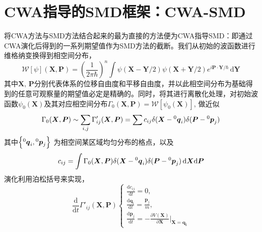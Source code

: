 
\section{CWA指导的SMD框架：CWA-SMD}

将CWA方法与SMD方法结合起来的最为直接的方法便为CWA指导SMD：即通过CWA演化后得到的一系列期望值作为SMD方法的截断。我们从初始的波函数进行维格纳变换得到相空间分布，
\begin{equation}
  \mathcal{W} \left[ \psi \right] (\boldsymbol{X}, \boldsymbol{P}) = \left(\frac{1}{2\pi \hbar}\right)^n \int \psi(\boldsymbol{X}-\boldsymbol{Y}/2) \psi(\boldsymbol{X} + \boldsymbol{Y}/2) e^{i \boldsymbol{P} \cdot \boldsymbol{Y} / \hbar} \, \mathrm{d}\boldsymbol{Y} 
\end{equation}
其中$\boldsymbol{X}, \, \boldsymbol{P}$分别代表体系的位移自由度和平移自由度，并以此相空间分布为基础得到的任意可观察量的期望值必定是精确的。同时，将其进行离散化处理，对初始波函数$\psi_0(\boldsymbol{X})$及其对应相空间分布$ \Gamma_0(\boldsymbol{X}, \boldsymbol{P}) = \mathcal{W}\left[ \psi_0(\boldsymbol{X}) \right] $, 做近似
\begin{equation}
  \Gamma_0 (\boldsymbol{X}, \boldsymbol{P}) \sim \sum_{i,j} \Gamma_{ij}'(\boldsymbol{X}, \boldsymbol{P}) = \sum c_{ij} \delta(\boldsymbol{X} - \prescript{0}{}{\boldsymbol{q}_i}) \delta(\boldsymbol{P} - \prescript{0}{}{\boldsymbol{p}_j})
\end{equation}
其中$\left\{ \prescript{0}{}{\boldsymbol{q}_i}, \prescript{0}{}{\boldsymbol{p}_j} \right\} $ 为相空间某区域均匀分布的格点，以及
\begin{equation}
  c_{ij} = \int \Gamma_0(\boldsymbol{X}, \boldsymbol{P}) \delta(\boldsymbol{X} - \prescript{0}{}{\boldsymbol{q}_i}) \delta(\boldsymbol{P} - \prescript{0}{}{\boldsymbol{p}_j}) \, \mathrm{d}\boldsymbol{X}\mathrm{d}\boldsymbol{P}
\end{equation}
演化利用泊松括号来实现，
\begin{equation}
\frac{\mathrm{d}}{\mathrm{d}t} \Gamma'_{ij}(\boldsymbol{X}, \boldsymbol{P})
\begin{cases}
	\frac{\mathrm{d} c_{ij}}{\mathrm{d} t} = 0 , \\
	\frac{\mathrm{d} \boldsymbol{q}_i}{\mathrm{d} t} = \frac{\boldsymbol{p}_j}{m} , \\
	\frac{\mathrm{d} \boldsymbol{p}_j}{\mathrm{d} t} = - \frac{\partial V(\boldsymbol{X})}{\partial \boldsymbol{X}}\bigg|_{\boldsymbol{X} = \boldsymbol{q_i}}
\end{cases}
\end{equation}
